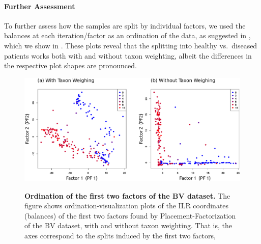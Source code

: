 \paragraph{Further Assessment}
\label{sec:Factorization:sub:Evaluation:sub:BVDataset:par:FurtherAssessment}

To further assess how the samples are split by individual factors,
we used the balances at each iteration/factor as an ordination of the data, as suggested in ,
which we show in .
These plots reveal that the splitting into healthy vs.~diseased patients works both with and without taxon weighting,
albeit the differences in the respective plot shapes are pronounced.

\begin{figure}[!htb]
    \centering
     \includegraphics[width=\linewidth]{pdf/pf_bv_place_ilr_ordination.pdf}
    \begin{subfigure}{0pt}
        \label{fig:pf_bv_place_ilr_ordination:sub:with_taxon_weighting}
    \end{subfigure}
    \begin{subfigure}{0pt}
        \label{fig:pf_bv_place_ilr_ordination:sub:without_taxon_weighting}
    \end{subfigure}
    \caption[Ordination of the first two factors of the \acs{BV} dataset]{
        \textbf{Ordination of the first two factors of the \ac{BV} dataset.}
        The figure shows ordination-visualization plots of the ILR coordinates (balances) of the first two factors
        found by Placement-Factorization of the \ac{BV} dataset,
         with and
         without taxon weighting.
        That is, the axes correspond to the splits induced by the first two factors,
}
\end{figure}
